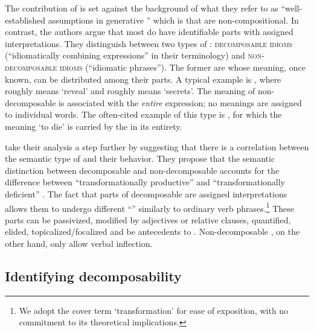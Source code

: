 \documentclass[output=paper]{langsci/langscibook}
\begin{document}
The contribution of \citet[p. 503]{nunberg94} is set against the background of what they refer to as ``well-established assumptions in generative '' which is that  are non-compositional. In contrast, the authors argue that most  do have identifiable parts with assigned interpretations. They distinguish between two types of
: {\scshape decomposable idioms} (``idiomatically combining
expressions'' in their terminology) and {\scshape non-decomposable idioms}
(``idiomatic phrases''). The former are  whose meaning, once known, can be distributed among their parts. A typical example is , where  roughly means `reveal' and
 roughly means `secrets'. The meaning of
non-decomposable  is associated with the \emph{entire}
expression; no meanings are assigned to individual words. The
often-cited example of this type is , for
which the meaning `to die' is carried by the  in its entirety.


\citet{nunberg94} take their analysis a step further by suggesting that there is a correlation between the semantic type of  and their behavior. They propose that the semantic distinction between
decomposable and non-de\-com\-pos\-able  accounts for the difference
between ``transformationally productive'' and ``transformationally
deficient'' . The fact that parts of decomposable  are
assigned interpretations allows them to undergo different
``'' similarly to ordinary verb phrases.\footnote{We adopt the cover term `transformation' for ease of exposition, with no commitment to its theoretical implications.} These parts
can be passivized, modified by adjectives or relative clauses,
quantified, elided, topicalized/focalized and be antecedents to
. Non-decomposable , on the other hand,
only allow verbal inflection.



\subsection{Identifying decomposability}
\end{document}

